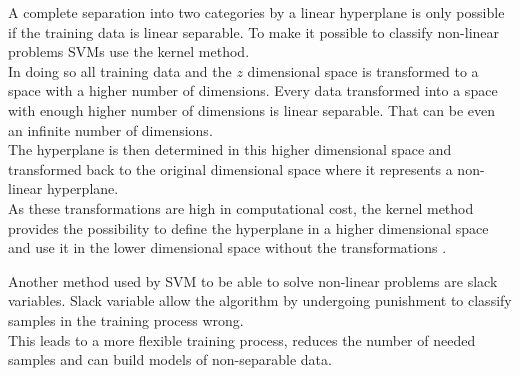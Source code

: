 A complete separation into two categories by a linear hyperplane is only possible if the training data is linear separable.
To make it possible to classify non-linear problems \acp{SVM} use the kernel method.\\
In doing so all training data and the $z$ dimensional space is transformed to a space with a higher number of dimensions.
Every data transformed into a space with enough higher number of dimensions is linear separable.
That can be even an infinite number of dimensions.\\
The hyperplane is then determined in this higher dimensional space and transformed back to the original dimensional space where it represents a non-linear hyperplane.\\
As these transformations are high in computational cost, the kernel method provides the possibility to define the hyperplane in a higher dimensional space and use it in the lower dimensional space without the transformations \cite{2016SupportMachine}.

Another method used by \ac{SVM} to be able to solve non-linear problems are slack variables.
Slack variable allow the algorithm by undergoing punishment to classify samples in the training process wrong.\\
This leads to a more flexible training process, reduces the number of needed samples and can build models of non-separable data.



